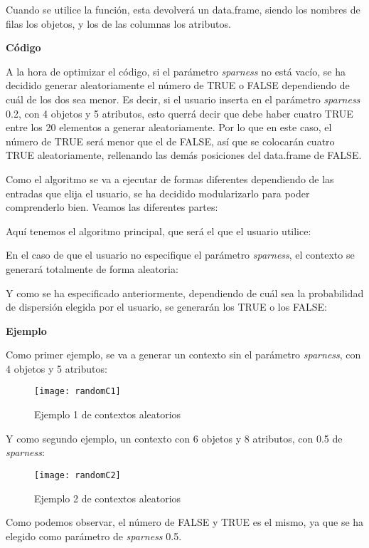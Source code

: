     Cuando se utilice la funci\'on, esta devolver\'a un data.frame, siendo los nombres de filas los objetos, y los de las columnas 
    los atributos.


    \bigskip

    \textbf{C\'odigo}

    A la hora de optimizar el c\'odigo, si el par\'ametro \textit{sparness} no est\'a vac\'io, se ha decidido generar aleatoriamente el n\'umero de 
    TRUE o FALSE dependiendo de cu\'al de los dos sea menor. Es decir, si el usuario inserta en el par\'ametro \textit{sparness} 0.2, con 4 objetos 
    y 5 atributos, esto querr\'a decir que debe haber cuatro TRUE entre los 20 elementos a generar aleatoriamente. Por lo que en este caso, 
    el n\'umero de TRUE ser\'a menor que el de FALSE, as\'i que se colocar\'an cuatro TRUE aleatoriamente, rellenando las dem\'as posiciones 
    del data.frame de FALSE.

    Como el algoritmo se va a ejecutar de formas diferentes dependiendo de las entradas que elija el usuario, se ha decidido modularizarlo 
    para poder comprenderlo bien. Veamos las diferentes partes:


    Aqu\'i tenemos el algoritmo principal, que ser\'a el que el usuario utilice:

    
    \bigskip

    En el caso de que el usuario no especifique el par\'ametro \textit{sparness}, el contexto se generar\'a totalmente de forma aleatoria:

    
    \clearpage

    Y como se ha especificado anteriormente, dependiendo de cu\'al sea la probabilidad de dispersi\'on elegida por el usuario, se generar\'an 
    los TRUE o los FALSE:

    
    \bigskip
    
    \bigskip

    \textbf{Ejemplo}

    Como primer ejemplo, se va a generar un contexto sin el par\'ametro \textit{sparness}, con 4 objetos y 5 atributos:

    \begin{figure}[H]
        \centering
        \texttt{[image: randomC1]}
        \caption{Ejemplo 1 de contextos aleatorios}
        \label{fig:randomC1}
    \end{figure}

    \bigskip
    Y como segundo ejemplo, un contexto con 6 objetos y 8 atributos, con 0.5 de \textit{sparness}:

    \begin{figure}[H]
        \centering
        \texttt{[image: randomC2]}
        \caption{Ejemplo 2 de contextos aleatorios}
        \label{fig:randomC2}
    \end{figure}

    Como podemos observar, el n\'umero de FALSE y TRUE es el mismo, ya que se ha elegido como par\'ametro de \textit{sparness} 0.5.
    